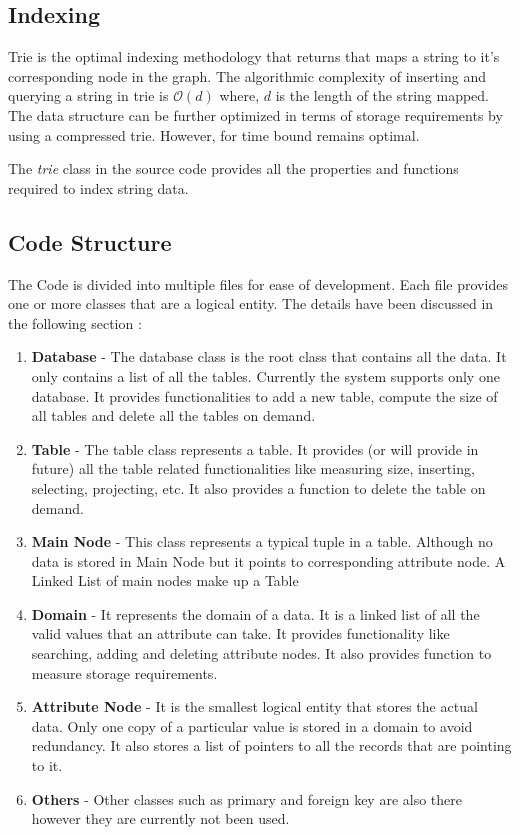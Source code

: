 \documentclass[12pt, oneside]{book}
\begin{document}
\subsection{Indexing}
Trie is the optimal indexing methodology that returns that maps a string to it's corresponding node in the graph. The algorithmic complexity of inserting and querying a string in trie is $\mathcal{O} \left( d\right)$ where, $d$ is the length of the string mapped. The data structure can be further optimized in terms of storage requirements by using a compressed trie. However, for time bound remains optimal.
\par
The \emph{trie} class in the source code provides all the properties and functions required to index string data.
\subsection{Code Structure}
The Code is divided into multiple files for ease of development. Each file provides one or more classes that are a logical entity. The details have been discussed in the following section :
\begin{enumerate}
 \item \textbf{Database} - The database class is the root class that contains all the data. It only contains a list of all the tables. Currently the system supports only one database. It provides functionalities to add a new table, compute the size of all tables and delete all the tables on demand.
 \item \textbf{Table} - The table class represents a table. It provides (or will provide in future) all the table related functionalities like measuring size, inserting, selecting, projecting, etc. It also provides a function to delete the table on demand.
 \item \textbf{Main Node} - This class represents a typical tuple in a table. Although no data is stored in Main Node but it points to corresponding attribute node. A Linked List of main nodes make up a Table
 \item \textbf{Domain} - It represents the domain of a data. It is a linked list of all the valid values that an attribute can take. It provides functionality like searching, adding and deleting attribute nodes. It also provides function to measure storage requirements.
 \item \textbf{Attribute Node} - It is the smallest logical entity that stores the actual data. Only one copy of a particular value is stored in a domain to avoid redundancy. It also stores a list of pointers to all the records that are pointing to it.
 \item \textbf{Others} - Other classes such as primary and foreign key are also there however they are currently not been used.
\end{enumerate}
\end{document}
